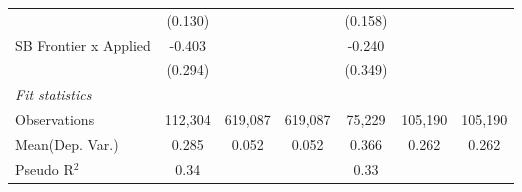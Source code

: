 \begin{tabular}{lcccccc}
                         & (0.130)       &         &         & (0.158)       &         &   \\   
   SB Frontier x Applied & -0.403        &         &         & -0.240        &         &   \\   
                         & (0.294)       &         &         & (0.349)       &         &   \\   
   \midrule
   \emph{Fit statistics}\\
   Observations          & 112,304       & 619,087 & 619,087 & 75,229        & 105,190 & 105,190\\  
Mean(Dep. Var.) & 0.285 & 0.052 & 0.052 & 0.366 & 0.262 & 0.262 \\
   Pseudo R$^2$          & 0.34          &         &         & 0.33          &         & \\  
   

\end{tabular}
